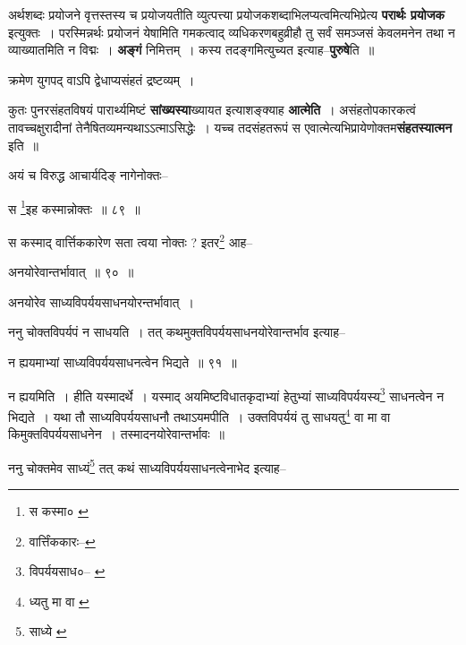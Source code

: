\documentclass[article,12pt,a4paper]{memoir}
\begin{document}
	  \pstart अर्थशब्दः प्रयोजने वृत्तस्तस्य च प्रयोजयतीति व्युत्पत्त्या प्रयोजकशब्दाभिलप्यत्वमित्यभिप्रेत्य \textbf{परार्थः प्रयोजक} इत्युक्तः । परस्मिन्नर्थः प्रयोजनं येषामिति गमकत्वाद् व्यधिकरणबहुव्रीहौ तु सर्वं समञ्जसं केवलमनेन तथा न व्याख्यातमिति न विद्मः । \textbf{अङ्गं} निमित्तम् । कस्य तदङ्गमित्युच्यत इत्याह--\textbf{पुरुषे}ति ॥
	\pend
      

	  \pstart क्रमेण युगपद् वाऽपि द्वेधाप्यसंहतं द्रष्टव्यम् ।
	\pend
      

	  \pstart कुतः पुनरसंहतविषयं पारार्थ्यमिष्टं \textbf{सांख्यस्या}ख्यायत इत्याशङ्क्याह \textbf{आत्मेति} । असंहतोपकारकत्वं तावच्चक्षुरादीनां तेनैषितव्यमन्यथाऽऽत्माऽसिद्धेः । यच्च तदसंहतरूपं स एवात्मेत्यभिप्रायेणोक्तम\textbf{संहतस्यात्मन} इति ॥
	\pend
      \leavevmode{}
	  \bigskip
	  \begingroup
	

	  \pstart अयं च विरुद्ध आचार्यदिङ् नागेनोक्तः--
	\pend
       
	  \bigskip
	  \begingroup
	

	  \pstart स \footnote{स कस्मा० \cite{dp-msC}}इह कस्मान्नोक्तः ॥ ८९ ॥
	\pend
      
	  \endgroup
	 

	  \pstart स कस्माद् वार्त्तिककारेण सता त्वया नोक्तः ? इतर\footnote{वार्त्तिंककारः--\cite{dp-msD-n}} आह--
	\pend
       
	  \bigskip
	  \begingroup
	

	  \pstart अनयोरेवान्तर्भावात् ॥ ९० ॥
	\pend
      
	  \endgroup
	 

	  \pstart अनयोरेव साध्यविपर्ययसाधनयोरन्तर्भावात् ।
	\pend
       

	  \pstart ननु चोक्तविपर्यपं न साधयति । तत् कथमुक्तविपर्ययसाधनयोरेवान्तर्भाव इत्याह--
	\pend
       
	  \bigskip
	  \begingroup
	

	  \pstart न ह्ययमाभ्यां साध्यविपर्ययसाधनत्वेन भिद्यते ॥ ९१ ॥
	\pend
      
	  \endgroup
	 

	  \pstart न ह्ययमिति । हीति यस्मादर्थे । यस्माद् अयमिष्टविधातकृदाभ्यां हेतुभ्यां साध्यविपर्ययस्य\footnote{विपर्ययसाध०--\cite{dp-msA} \cite{dp-msB} \cite{dp-edP} \cite{dp-edH} \cite{dp-edE} \cite{dp-edN}} साधनत्वेन न भिद्यते । यथा तौ साध्यविपर्ययसाधनौ तथाऽयमपीति । उक्तविपर्ययं तु साधयतु\footnote{ध्यतु मा वा \cite{dp-edE} \cite{dp-msD}} वा मा वा किमुक्तविपर्ययसाधनेन । तस्मादनयोरेवान्तर्भावः ॥
	\pend
       

	  \pstart ननु चोक्तमेव साध्यं\footnote{साध्ये \cite{dp-msA} \cite{dp-msB} \cite{dp-edP} \cite{dp-edH} \cite{dp-edN}} तत् कथं साध्यविपर्ययसाधनत्वेनाभेद इत्याह--
	\pend
       
\end{document}
